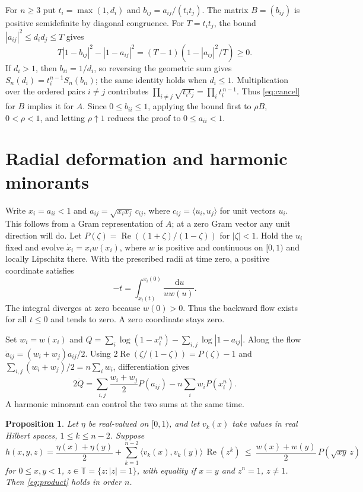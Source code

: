 \documentclass[10pt,twoside,reqno]{amsart}
\newtheorem{proposition}{Proposition}[section]
\numberwithin{equation}{section}
\newcommand{\T}{\mathbb T}
\newcommand{\Real}{\operatorname{Re}}
\newcommand{\dd}{\,\mathrm{d}}
\begin{document}
For \(n\ge3\) put \(t_i=\max(1,d_i)\) and \(b_{ij}=a_{ij}/(t_it_j)\).
The matrix \(B=(b_{ij})\) is positive semidefinite by diagonal congruence.
For \(T=t_i t_j\), the bound \(|a_{ij}|^2\le d_i d_j\le T\) gives
\[
 T|1-b_{ij}|^2-|1-a_{ij}|^2=(T-1)(1-|a_{ij}|^2/T)\ge0.
\]
If \(d_i>1\), then \(b_{ii}=1/d_i\), so reversing the geometric sum gives
\(S_n(d_i)=t_i^{n-1}S_n(b_{ii})\); the same identity holds when \(d_i\le1\).
Multiplication over the ordered pairs \(i\ne j\) contributes
\(\prod_{i\ne j}\sqrt{t_i t_j}=\prod_i t_i^{\,n-1}\). Thus
\eqref{eq:cancel} for \(B\) implies it for \(A\).
Since \(0\le b_{ii}\le1\), applying the bound first to \(\rho B\),
\(0<\rho<1\), and letting \(\rho\uparrow1\) reduces the proof to
\(0\le a_{ii}<1\).

\section{Radial deformation and harmonic minorants}

Write \(x_i=a_{ii}<1\) and \(a_{ij}=\sqrt{x_i x_j}\,c_{ij}\), where
\(c_{ij}=\langle u_i,u_j\rangle\) for unit vectors \(u_i\). This follows
from a Gram representation of \(A\); at a zero Gram vector any unit direction
will do. Let \(P(\zeta)=\Real((1+\zeta)/(1-\zeta))\) for \(|\zeta|<1\).
Hold the \(u_i\) fixed and evolve \(\dot x_i=x_i w(x_i)\), where \(w\) is
positive and continuous on \([0,1)\) and locally Lipschitz there. With the
prescribed radii at time zero, a positive coordinate satisfies
\[
 -t=\int_{x_i(t)}^{x_i(0)}\frac{\dd u}{u w(u)}.
\]
The integral diverges at zero because \(w(0)>0\). Thus the backward flow
exists for all \(t\le0\) and tends to zero. A zero coordinate stays zero.

Set \(w_i=w(x_i)\) and
\(Q=\sum_i\log(1-x_i^n)-\sum_{i,j}\log|1-a_{ij}|\).
Along the flow \(\dot a_{ij}=(w_i+w_j)a_{ij}/2\).
Using \(2\Real(\zeta/(1-\zeta))=P(\zeta)-1\) and
\(\sum_{i,j}(w_i+w_j)/2=n\sum_iw_i\), differentiation gives
\begin{equation}\label{eq:flow}
 2\dot Q=\sum_{i,j}\frac{w_i+w_j}{2}P(a_{ij})
               -n\sum_i w_i P(x_i^n).
\end{equation}
A harmonic minorant can control the two sums at the same time.

\begin{proposition}\label{prop:flow}
Let \(\eta\) be real-valued on \([0,1)\), and let \(v_k(x)\) take values in
real Hilbert spaces, \(1\le k\le n-2\). Suppose
\[
 h(x,y,z)=\frac{\eta(x)+\eta(y)}2+
       \sum_{k=1}^{n-2}\langle v_k(x),v_k(y)\rangle\,\Real(z^k)
 \ \le\ \frac{w(x)+w(y)}2\,P(\sqrt{xy}\,z)
\]
for \(0\le x,y<1\), \(z\in\T=\{z:|z|=1\}\), with equality if \(x=y\)
and \(z^n=1\), \(z\ne1\). Then \eqref{eq:product} holds in order \(n\).
\end{proposition}
\end{document}
